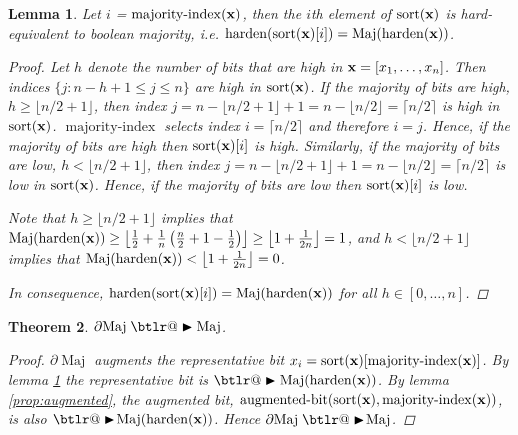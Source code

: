 \documentclass{article}
\makeatletter
\theoremstyle{plain}
\newtheorem{theorem}{Theorem}[section]
\newtheorem{lemma}[theorem]{Lemma}
\theoremstyle{definition}
\theoremstyle{remark}
\DeclareRobustCommand{\btright}{\mathrel{\mathpalette\btlr@\blacktriangleright}}
\newcommand{\btlr@}[2]{%
	\begingroup
	\sbox\z@{$\m@th#1\triangleright$}%
	\sbox\tw@{\resizebox{1.1\wd\z@}{1.1\ht\z@}{\raisebox{\depth}{$\m@th#1\mkern-1mu#2$}}}%
	\ht\tw@=\ht\z@ \dp\tw@=\dp\z@ \wd\tw@=\wd\z@
	\copy\tw@
	\endgroup
}
\makeatother
\begin{document}
\begin{lemma}
	\label{lem:maj}
	Let $i$ = $\operatorname{majority-index}({\bf x})$, then the $i$th element of $\operatorname{sort}({\bf x})$ is hard-equivalent to boolean majority, i.e. $\operatorname{harden}(\operatorname{sort}({\bf x})[i]) = \operatorname{Maj}(\operatorname{harden}({\bf x}))$.
	\begin{proof}
		Let $h$ denote the number of bits that are high in ${\bf x} = [x_{1}, \dots, x_{n}]$. Then indices $\{j : n-h+1 \leq j \leq n\}$ are high in $\operatorname{sort}({\bf x})$. If the majority of bits are high, $h \geq \lfloor n/2 + 1 \rfloor$, then index $j=n - \lfloor n/2 + 1 \rfloor + 1 = n - \lfloor n/2 \rfloor = \lceil n/2 \rceil$ is high in $\operatorname{sort}({\bf x})$. $\operatorname{majority-index}$ selects index $i = \lceil n/2 \rceil$ and therefore $i=j$. Hence, if the majority of bits are high then $\operatorname{sort}({\bf x})[i]$ is high. Similarly, if the majority of bits are low, $h < \lfloor n/2 + 1 \rfloor$, then index $j=n - \lfloor n/2 + 1 \rfloor + 1 = n - \lfloor n/2 \rfloor = \lceil n/2 \rceil$ is low in $\operatorname{sort}({\bf x})$. Hence, if the majority of bits are low then $\operatorname{sort}({\bf x})[i]$ is low.
		
		Note that $h \geq \lfloor n/2 + 1 \rfloor$ implies that $\operatorname{Maj}(\operatorname{harden}({\bf x})) \geq \left\lfloor \frac{1}{2} + \frac{1}{n}\left(\frac{n}{2} + 1 - \frac{1}{2} \right) \right\rfloor \geq \left\lfloor 1 + \frac{1}{2n} \right\rfloor = 1$, and $h < \lfloor n/2 + 1 \rfloor$ implies that $\operatorname{Maj}(\operatorname{harden}({\bf x})) < \left\lfloor 1 + \frac{1}{2n} \right\rfloor = 0$.
		
		In consequence, $\operatorname{harden}(\operatorname{sort}({\bf x})[i]) = \operatorname{Maj}(\operatorname{harden}({\bf x}))$ for all $h \in [0,\dots, n]$.
	\end{proof}
\end{lemma}

\begin{theorem}\label{prop:majority}
	$\partial\!\operatorname{Maj} \btright \operatorname{Maj}$.
	\begin{proof}
		$\partial\!\operatorname{Maj}$ augments the representative bit $x_{i} = \operatorname{sort}({\bf x})[\operatorname{majority-index}({\bf x})]$. By lemma \ref{lem:maj} the representative bit is $\btright \operatorname{Maj}(\operatorname{harden}({\bf x}))$.
		By lemma \ref{prop:augmented}, the augmented bit, $\operatorname{augmented-bit}(\operatorname{sort}({\bf x}), \operatorname{majority-index}({\bf x}))$, is also $\btright\!\operatorname{Maj}(\operatorname{harden}({\bf x}))$. Hence $\partial\!\operatorname{Maj} \btright\!\operatorname{Maj}$.
	\end{proof}
\end{theorem}
\end{document}
